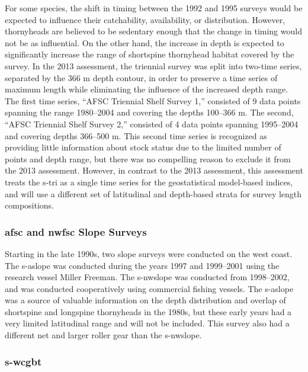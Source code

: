 \documentclass[11pt,
  english,
  letterpaper,
]{article}
\begin{document}
For some species, the shift in timing between the 1992 and 1995 surveys would be expected to influence their catchability, availability, or distribution. However, thornyheads are believed to be sedentary enough that the change in timing would not be as influential. On the other hand, the increase in depth is expected to significantly increase the range of shortspine thornyhead habitat covered by the survey. In the 2013 assessment, the triennial survey was split into two-time series, separated by the 366 m depth contour, in order to preserve a time series of maximum length while eliminating the influence of the increased depth range. The first time series, ``AFSC Triennial Shelf Survey 1,'' consisted of 9 data points spanning the range 1980--2004 and covering the depths 100--366 m. The second, ``AFSC Triennial Shelf Survey 2,'' consisted of 4 data points spanning 1995--2004 and covering depths 366--500 m. This second time series is recognized as providing little information about stock status due to the limited number of points and depth range, but there was no compelling reason to exclude it from the 2013 assessment. However, in contrast to the 2013 assessment, this assessment treats the \gls{s-tri} as a single time series for the geostatistical model-based indices, and will use a different set of latitudinal and depth-based strata for survey length compositions.

\hypertarget{and-slope-surveys}{%
\subsubsection{\texorpdfstring{\acrshort{afsc} and \acrshort{nwfsc} Slope Surveys}{ and  Slope Surveys}}\label{and-slope-surveys}}

Starting in the late 1990s, two slope surveys were conducted on the west coast. The \gls{s-aslope} was conducted during the years 1997 and 1999--2001 using the research vessel Miller Freeman. The \gls{s-nwslope} was conducted from 1998--2002, and was conducted cooperatively using commercial fishing vessels. The \gls{s-aslope} was a source of valuable information on the depth distribution and overlap of shortspine and longspine thornyheads in the 1980s, but these early years had a very limited latitudinal range and will not be included. This survey also had a different net and larger roller gear than the \gls{s-nwslope}.

\hypertarget{section-1}{%
\subsubsection{\texorpdfstring{\acrlong{s-wcgbt}}{}}\label{section-1}}
\end{document}
